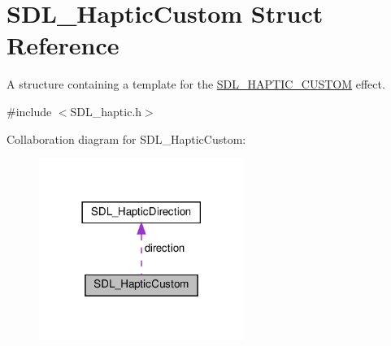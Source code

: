 \hypertarget{structSDL__HapticCustom}{}\section{S\+D\+L\+\_\+\+Haptic\+Custom Struct Reference}
\label{structSDL__HapticCustom}


A structure containing a template for the \hyperlink{SDL__haptic_8h_a8a18c4de1076ac9bebd718329d16db29}{S\+D\+L\+\_\+\+H\+A\+P\+T\+I\+C\+\_\+\+C\+U\+S\+T\+OM} effect.  




{\ttfamily \#include $<$S\+D\+L\+\_\+haptic.\+h$>$}



Collaboration diagram for S\+D\+L\+\_\+\+Haptic\+Custom\+:\nopagebreak
\begin{figure}[H]
\begin{center}
\leavevmode
\includegraphics[width=189pt]{structSDL__HapticCustom__coll__graph}
\end{center}
\end{figure}
